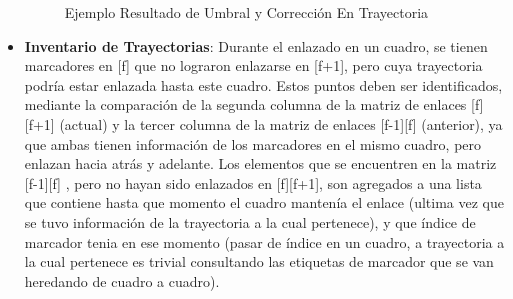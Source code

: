 \begin{itemize}
\begin{figure}[H]
 \centering
 \caption{Ejemplo Resultado de Umbral y Corrección En Trayectoria}
\label{distro_acc_track_m13_fix}
\end{figure}
\item \textbf{Inventario de Trayectorias}: Durante el enlazado en un cuadro, se tienen marcadores en [f] que no lograron enlazarse en [f+1], pero cuya trayectoria podría estar enlazada hasta este cuadro.
Estos puntos deben ser identificados, mediante la comparación de la segunda columna de la matriz de enlaces [f][f+1] (actual) y la tercer columna de la matriz de enlaces [f-1][f] (anterior), ya que ambas tienen información de los marcadores en el mismo cuadro, pero enlazan hacia atrás y adelante.
Los elementos que se encuentren en la matriz [f-1][f] , pero no hayan sido enlazados en [f][f+1], son agregados a una lista que  contiene hasta que momento el cuadro mantenía el enlace (ultima vez que se tuvo información de la trayectoria a la cual pertenece), y que índice de marcador tenia en ese momento (pasar de índice en un cuadro, a trayectoria a la cual pertenece es trivial consultando las etiquetas de marcador que se van heredando de cuadro a cuadro).


\end{itemize}
